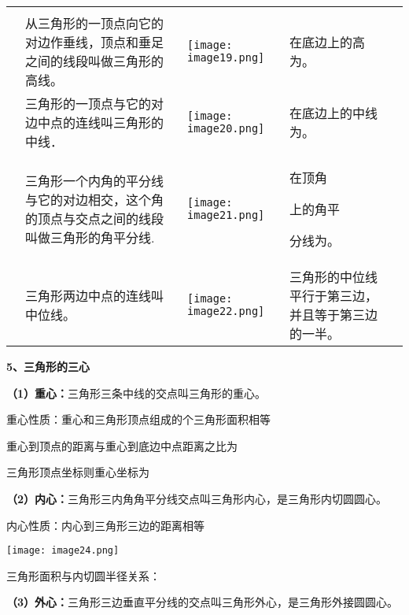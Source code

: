 \begin{longtable}[]{@{}lllll@{}}
\toprule
\endhead
& & & &\tabularnewline
&
从三角形的一顶点向它的对边作垂线，顶点和垂足之间的线段叫做三角形的高线。
&
\texttt{[image: image19.png]}
& 在底边上的高为。 &\tabularnewline
& 三角形的一顶点与它的对边中点的连线叫三角形的中线． &
\texttt{[image: image20.png]}
& 在底边上的中线为。 &\tabularnewline
\begin{minipage}[t]{0.17\columnwidth}\raggedright
\strut
\end{minipage} & \begin{minipage}[t]{0.17\columnwidth}\raggedright
三角形一个内角的平分线与它的对边相交，这个角的顶点与交点之间的线段叫做三角形的角平分线.\strut
\end{minipage} & \begin{minipage}[t]{0.17\columnwidth}\raggedright
\texttt{[image: image21.png]}\strut
\end{minipage} & \begin{minipage}[t]{0.17\columnwidth}\raggedright
在顶角

上的角平

分线为。\strut
\end{minipage} & \begin{minipage}[t]{0.17\columnwidth}\raggedright
\strut
\end{minipage}\tabularnewline
& 三角形两边中点的连线叫中位线。 &
\texttt{[image: image22.png]}
& 三角形的中位线平行于第三边，并且等于第三边的一半。 &\tabularnewline
\bottomrule
\end{longtable}

\textbf{5、三角形的三心}

\textbf{（1）重心：}三角形三条中线的交点叫三角形的重心。

重心性质：重心和三角形顶点组成的个三角形面积相等

重心到顶点的距离与重心到底边中点距离之比为

三角形顶点坐标则重心坐标为

\textbf{（2）内心：}三角形三内角角平分线交点叫三角形内心，是三角形内切圆圆心。

内心性质：内心到三角形三边的距离相等

\texttt{[image: image24.png]}

三角形面积与内切圆半径关系：

\textbf{（3）外心：}三角形三边垂直平分线的交点叫三角形外心，是三角形外接圆圆心。


